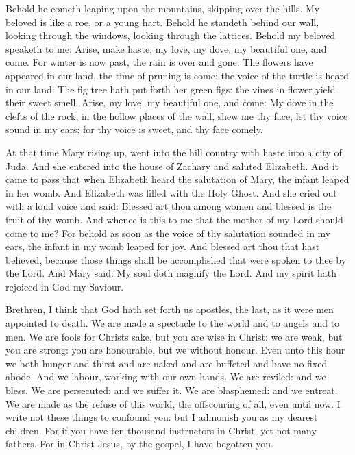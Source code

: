 Behold he cometh leaping upon the
mountains, skipping over the hills.
My beloved is like a roe, or a young hart. Behold he standeth
behind our wall, looking through the windows, looking through the
lattices.
Behold my beloved speaketh to me: Arise, make haste, my love, my
dove, my beautiful one, and come.
For winter is now past, the rain is over and gone.
The flowers have appeared in our land, the time of pruning is
come: the voice of the turtle is heard in our land:
The fig tree hath put forth her green figs: the vines in flower
yield their sweet smell. Arise, my love, my beautiful one, and come:
My dove in the clefts of the rock, in the hollow places of the
wall, shew me thy face, let thy voice sound in my ears: for thy voice is
sweet, and thy face comely.

\medskip


At that time Mary rising up, went into the hill country with
haste into a city of Juda.
And she entered into the house of Zachary and saluted Elizabeth.
And it came to pass that when Elizabeth heard the salutation of
Mary, the infant leaped in her womb. And Elizabeth was filled with the
Holy Ghost.
And she cried out with a loud voice and said: Blessed art thou
among women and blessed is the fruit of thy womb.
And whence is this to me that the mother of my Lord should come to
me?
For behold as soon as the voice of thy salutation sounded in my
ears, the infant in my womb leaped for joy.
And blessed art thou that hast believed, because those things
shall be accomplished that were spoken to thee by the Lord.
And Mary said: My soul doth magnify the Lord.
And my spirit hath rejoiced in God my Saviour.


\bigskip




Brethren, I think that God hath set forth us apostles, the last, as it
were men appointed to death. We are made a spectacle to the world and to
angels and to men.
We are fools for Christs sake, but you are wise in Christ: we are
weak, but you are strong: you are honourable, but we without honour.
Even unto this hour we both hunger and thirst and are naked and
are buffeted and have no fixed abode.
And we labour, working with our own hands. We are reviled: and we
bless. We are persecuted: and we suffer it.
We are blasphemed: and we entreat. We are made as the refuse of
this world, the offscouring of all, even until now.
I write not these things to confound you: but I admonish you as my
dearest children.
For if you have ten thousand instructors in Christ, yet not many
fathers. For in Christ Jesus, by the gospel, I have begotten you.

